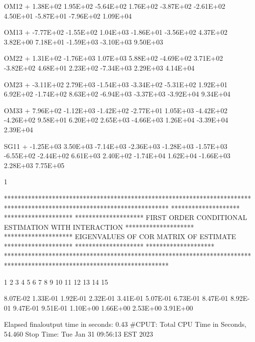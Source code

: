 \documentclass[
  letterpaper,
  toc=chapterentrywithdots,
  listof=totoc,
  11pt,
  headings=small,
  usegeometry]{scrreprt}
\begin{document}
\begin{nonmemlisting}
 OM12
+        1.38E+02  1.95E+02 -5.64E+02  1.76E+02 -3.87E+02 -2.61E+02  4.50E+01 -5.87E+01 -7.96E+02  1.09E+04
 
 OM13
+       -7.77E+02 -1.55E+02  1.04E+03 -1.86E+01 -3.56E+02  4.37E+02  3.82E+00  7.18E+01 -1.59E+03 -3.10E+03  9.50E+03
 
 OM22
+        1.31E+02 -1.76E+03  1.07E+03  5.88E+02 -4.69E+02  3.71E+02 -3.82E+02  4.68E+01  2.23E+02 -7.34E+03  2.29E+03  4.14E+04
 
 OM23
+       -3.11E+02  2.79E+03 -1.54E+03 -3.34E+02 -5.31E+02  1.92E+01  6.92E+02 -1.74E+02  8.63E+02 -6.94E+03 -3.37E+03 -3.92E+04
          9.34E+04
 
 OM33
+        7.96E+02 -1.12E+03 -1.42E+02 -2.77E+01  1.05E+03 -4.42E+02 -4.26E+02  9.58E+01  6.20E+02  2.65E+03 -4.66E+03  1.26E+04
         -3.39E+04  2.39E+04
 
 SG11
+       -1.25E+03  3.50E+03 -7.14E+03 -2.36E+03 -1.28E+03 -1.57E+03 -6.55E+02 -2.44E+02  6.61E+03  2.40E+02 -1.74E+04  1.62E+04
         -1.66E+03  2.28E+03  7.75E+05
 
1
 
 
 
 
 
 
 
 
 
 
 
 
 
 
 
 
 
 
 
 
 ************************************************************************************************************************
 ********************                                                                                ********************
 ********************               FIRST ORDER CONDITIONAL ESTIMATION WITH INTERACTION              ********************
 ********************                      EIGENVALUES OF COR MATRIX OF ESTIMATE                     ********************
 ********************                                                                                ********************
 ************************************************************************************************************************
 

             1         2         3         4         5         6         7         8         9        10        11        12
             13        14        15
 
         8.07E-02  1.33E-01  1.92E-01  2.32E-01  3.41E-01  5.07E-01  6.73E-01  8.47E-01  8.92E-01  9.47E-01  9.51E-01  1.10E+00
          1.66E+00  2.53E+00  3.91E+00
 
 Elapsed finaloutput time in seconds:     0.43
 #CPUT: Total CPU Time in Seconds,       54.460
Stop Time:
Tue Jan 31 09:56:13 EST 2023

\end{nonmemlisting}
\end{document}

